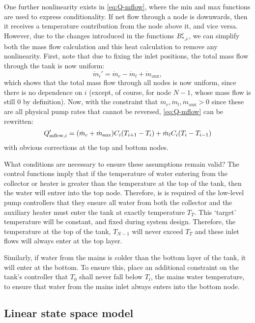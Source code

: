 One further nonlinearity exists in \autoref{eq:Q-mflow}, where the min and max functions are used to express conditionality.
If net flow through a node is downwards, then it receives a temperature contribution from the node above it, and vice versa.
However, due to the changes introduced in the functions $B_{\text{*}, i}'$, we can simplify both the mass flow calculation and this heat calculation to remove any nonlinearity.
First, note that due to fixing the inlet positions, the total mass flow through the tank is now uniform:
\begin{equation}
   \label{eq:mdot'}
   \dot{m}_i' = \dot{m}_c - \dot{m}_l + \dot{m}_{\text{aux}},
\end{equation}
which shows that the total mass flow through all nodes is now uniform, since there is no dependence on $i$ (except, of course, for node $N-1$, whose mass flow is still 0 by definition).
Now, with the constraint that $\dot{m}_c, \dot{m}_l, \dot{m}_{\text{aux}} > 0$ since these are all physical pump rates that cannot be reversed, \autoref{eq:Q-mflow} can be rewritten:
\begin{equation}
   Q_{\text{mflow}, i}' =  (\dot{m}_c + \dot{m}_{\text{aux}}) C_i (T_{i+1} - T_i)
               +  \dot{m}_l                         C_i (T_i - T_{i-1})
\end{equation}
with obvious corrections at the top and bottom nodes.

What conditions are necessary to ensure these assumptions remain valid?
The control functions imply that if the temperature of water entering from the collector or heater is greater than the temperature at the top of the tank, then the water will entrer into the top node.
Therefore, is is required of the low-level pump controllers that they ensure all water from both the collector and the auxiliary heater must enter the tank at exactly temperature $T_T$.
This `target' temperature will be constant, and fixed during system design.
Therefore, the temperature at the top of the tank, $T_{N-1}$ will never exceed $T_T$ and these inlet flows will always enter at the top layer.

Similarly, if water from the mains is colder than the bottom layer of the tank, it will enter at the bottom.
To ensure this, place an additional constraint on the tank's controller that $T_0$ shall never fall below $T_l$, the mains water temperature, to ensure that water from the mains inlet always enters into the bottom node.

\subsection{Linear state space model}

